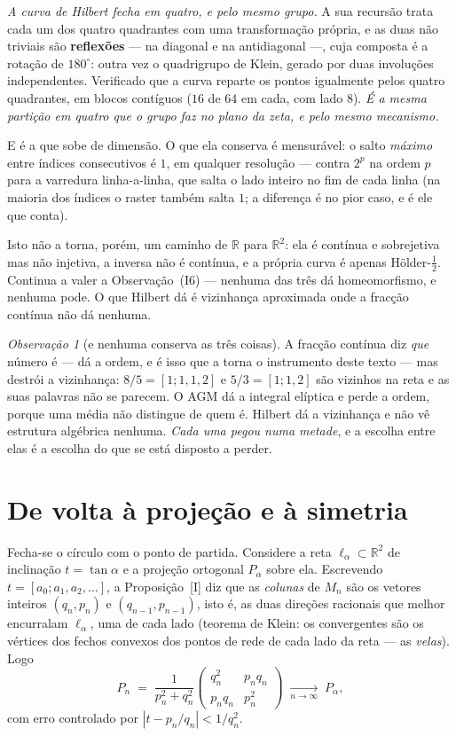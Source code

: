 \documentclass[11pt,a4paper]{article}
\theoremstyle{plain}
\theoremstyle{definition}
\theoremstyle{remark}
\newtheorem{obs}[teorema]{Observação}
\newcommand{\R}{\mathbb{R}}
\newcommand{\cf}[2]{[#1;#2]}
\begin{document}
\emph{A curva de Hilbert fecha em quatro, e pelo mesmo grupo.} A sua recursão trata cada um dos
quatro quadrantes com uma transformação própria, e as duas não triviais são \textbf{reflexões} ---
na diagonal e na antidiagonal ---, cuja composta é a rotação de $180^\circ$: outra vez o
quadrigrupo de Klein, gerado por duas involuções independentes. Verificado que a curva reparte os
pontos igualmente pelos quatro quadrantes, em blocos contíguos ($16$ de $64$ em cada, com lado
$8$). \emph{É a mesma partição em quatro que o grupo faz no plano da zeta, e pelo mesmo mecanismo.}

E é a que sobe de dimensão. O que ela conserva é mensurável: o salto
\emph{máximo} entre índices consecutivos é $1$, em qualquer resolução --- contra $2^p$ na ordem $p$
para a varredura linha-a-linha, que salta o lado inteiro no fim de cada linha (na maioria dos
índices o raster também salta $1$; a diferença é no pior caso, e é ele que conta).

Isto não a torna, porém, um caminho de $\R$ para $\R^2$: ela é contínua e sobrejetiva mas não
injetiva, a inversa não é contínua, e a própria curva é apenas Hölder-$\tfrac12$. Continua a valer
a Observação~(I6) --- nenhuma das três dá homeomorfismo, e nenhuma pode. O que
Hilbert dá é vizinhança aproximada onde a fracção contínua não dá nenhuma.

\begin{obs}[e nenhuma conserva as três coisas]
A fracção contínua diz \emph{que} número é --- dá a ordem, e é isso que a torna o instrumento deste
texto --- mas destrói a vizinhança: $8/5 = [1;1,1,2]$ e $5/3 = [1;1,2]$ são vizinhos na reta e as
suas palavras não se parecem. O AGM dá a integral elíptica e perde a ordem, porque uma média não distingue
de quem é. Hilbert dá a vizinhança e não vê estrutura algébrica nenhuma. \emph{Cada uma pegou numa
metade}, e a escolha entre elas é a escolha do que se está disposto a perder.
\end{obs}


\section{De volta à projeção e à simetria}\label{sec:proj}

Fecha-se o círculo com o ponto de partida. Considere a reta $\ell_\alpha \subset \R^2$ de
inclinação $t=\tan\alpha$ e a projeção ortogonal $P_\alpha$ sobre ela. Escrevendo
$t = \cf{a_0}{a_1,a_2,\dots}$, a Proposição~[I] diz que as \emph{colunas} de $M_n$
são os vetores inteiros $(q_n,p_n)$ e $(q_{n-1},p_{n-1})$, isto é, as duas direções racionais que
melhor encurralam $\ell_\alpha$, uma de cada lado (teorema de Klein: os convergentes são os
vértices dos fechos convexos dos pontos de rede de cada lado da reta --- as \emph{velas}). Logo
\[
  P_n \;=\; \frac{1}{p_n^2+q_n^2}\begin{pmatrix} q_n^2 & p_nq_n\\ p_nq_n & p_n^2\end{pmatrix}
  \;\xrightarrow[n\to\infty]{}\; P_\alpha,
\]
com erro controlado por $|t - p_n/q_n| < 1/q_n^2$.
\end{document}

